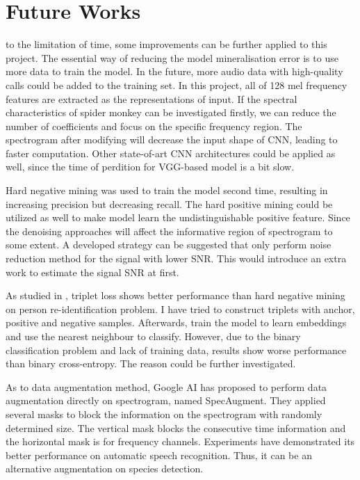 \chapter{Future Works}
\renewcommand{\baselinestretch}{\mystretch}
\label{chap:Future}
 to the limitation of time, some improvements can be further applied to this project. The essential way of reducing the model mineralisation error is to use more data to train the model. In the future, more audio data with high-quality calls could be added to the training set. In this project, all of 128 mel frequency features are extracted as the representations of input. If the spectral characteristics of spider monkey can be investigated firstly, we can reduce the number of coefficients and focus on the specific frequency region. The spectrogram after modifying will decrease the input shape of CNN, leading to faster computation. Other state-of-art CNN architectures could be applied as well, since the time of perdition for VGG-based model is a bit slow.

Hard negative mining was used to train the model second time, resulting in increasing precision but decreasing recall. The hard positive mining could be utilized as well to make model learn the undistinguishable positive feature. Since the denoising approaches will affect the informative region of spectrogram to some extent. A developed strategy can be suggested that only perform noise reduction method for the signal with lower SNR. This would introduce an extra work to estimate the signal SNR at first.

As studied in \cite{hermans2017defense}, triplet loss
shows better performance than hard negative mining on person re-identification problem. I have tried to construct triplets with anchor, positive and negative samples. Afterwards, train the model to learn embeddings and use the nearest neighbour to classify. However, due to the binary classification problem and lack of training data, results show worse performance than binary cross-entropy. The reason could be further investigated.

As to data augmentation method, Google AI \cite{park2019specaugment} has proposed to perform data augmentation directly on spectrogram, named SpecAugment. They applied several masks to block the information on the spectrogram with randomly determined size. The vertical mask blocks the consecutive time information and the horizontal mask is for frequency channels. Experiments have demonstrated its better performance on automatic speech recognition. Thus, it can be an alternative augmentation on species detection.



